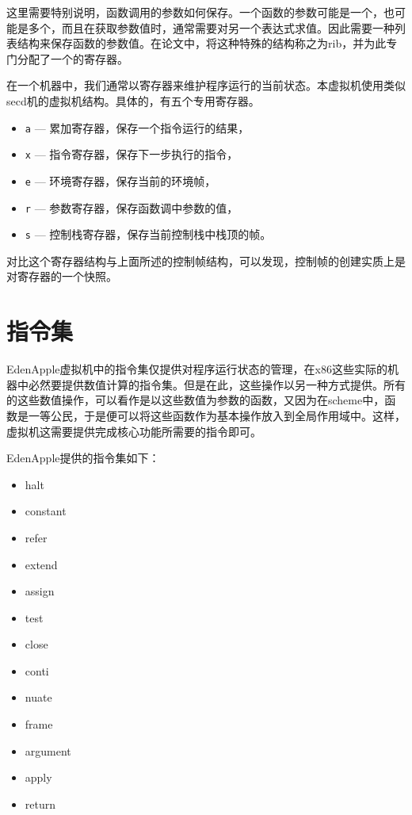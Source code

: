 这里需要特别说明，函数调用的参数如何保存。一个函数的参数可能是一个，也可能是多个，而且在获取参数值时，通常需要对另一个表达式求值。因此需要一种列表结构来保存函数的参数值。在论文中，将这种特殊的结构称之为rib，并为此专门分配了一个的寄存器。

在一个机器中，我们通常以寄存器来维护程序运行的当前状态。本虚拟机使用类似secd机的虚拟机结构。具体的，有五个专用寄存器。

\begin{itemize}
\item \texttt{a} --- 累加寄存器，保存一个指令运行的结果，
\item \texttt{x} --- 指令寄存器，保存下一步执行的指令，
\item \texttt{e} --- 环境寄存器，保存当前的环境帧，
\item \texttt{r} --- 参数寄存器，保存函数调中参数的值，
\item \texttt{s} --- 控制栈寄存器，保存当前控制栈中栈顶的帧。
\end{itemize}

对比这个寄存器结构与上面所述的控制帧结构，可以发现，控制帧的创建实质上是对寄存器的一个快照。

\section{指令集}

EdenApple虚拟机中的指令集仅提供对程序运行状态的管理，在x86这些实际的机器中必然要提供数值计算的指令集。但是在此，这些操作以另一种方式提供。所有的这些数值操作，可以看作是以这些数值为参数的函数，又因为在scheme中，函数是一等公民，于是便可以将这些函数作为基本操作放入到全局作用域中。这样，虚拟机这需要提供完成核心功能所需要的指令即可。

EdenApple提供的指令集如下：

{
\singlespacing
\fontsize{10}{10}
\ttfamily
\begin{itemize}
\item halt
\item constant
\item refer
\item extend
\item assign
\item test
\item close
\item conti
\item nuate
\item frame
\item argument
\item apply
\item return
\end{itemize}
}

